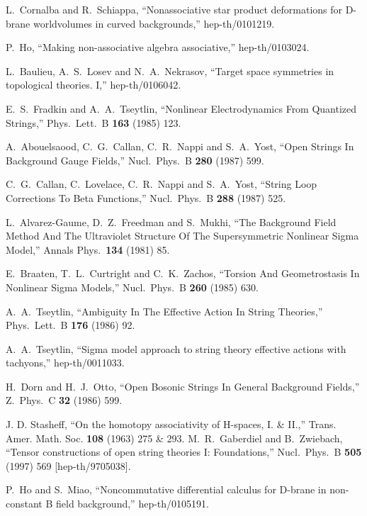 \documentclass[a4paper,12pt]{article}
\begin{document}
L.~Cornalba and R.~Schiappa,
``Nonassociative star product deformations for D-brane worldvolumes in
curved backgrounds,''
hep-th/0101219.

P.~Ho,
``Making non-associative algebra associative,''
hep-th/0103024.

L.~Baulieu, A.~S.~Losev and N.~A.~Nekrasov,
``Target space symmetries in topological theories. I,''
hep-th/0106042.



E.~S.~Fradkin and A.~A.~Tseytlin,
``Nonlinear Electrodynamics From Quantized Strings,''
Phys.\ Lett.\ B {\bf 163} (1985) 123.

A.~Abouelsaood, C.~G.~Callan, C.~R.~Nappi and S.~A.~Yost,
``Open Strings In Background Gauge Fields,''
Nucl.\ Phys.\ B {\bf 280} (1987) 599.

C.~G.~Callan, C.~Lovelace, C.~R.~Nappi and S.~A.~Yost,
``String Loop Corrections To Beta Functions,''
Nucl.\ Phys.\ B {\bf 288} (1987) 525.

L.~Alvarez-Gaume, D.~Z.~Freedman and S.~Mukhi,
``The Background Field Method And The Ultraviolet Structure Of 
The Supersymmetric Nonlinear Sigma Model,''
Annals Phys.\  {\bf 134} (1981) 85.

E.~Braaten, T.~L.~Curtright and C.~K.~Zachos,
``Torsion And Geometrostasis In Nonlinear Sigma Models,''
Nucl.\ Phys.\ B {\bf 260} (1985) 630.

A.~A.~Tseytlin,
``Ambiguity In The Effective Action In String Theories,''
Phys.\ Lett.\ B {\bf 176} (1986) 92.

A.~A.~Tseytlin,
``Sigma model approach to string theory effective actions with tachyons,''
hep-th/0011033.

H.~Dorn and H.~J.~Otto,
``Open Bosonic Strings In General Background Fields,''
Z.\ Phys.\ C {\bf 32} (1986) 599.
 
J. D. Stasheff, ``On the homotopy associativity of H-spaces,
	I. \& II.,'' Trans. Amer. Math. Soc. {\bf 108} (1963) 275 \& 293. 
M.~R.~Gaberdiel and B.~Zwiebach,
``Tensor constructions of open string theories I: Foundations,''
Nucl.\ Phys.\ B {\bf 505} (1997) 569
[hep-th/9705038].

P.~Ho and S.~Miao,
``Noncommutative differential calculus for D-brane in non-constant B  
field background,''
hep-th/0105191.
\end{document}

